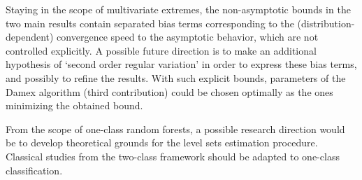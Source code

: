%
Staying in the scope of multivariate extremes, the non-asymptotic bounds in the two main results contain separated bias terms corresponding to the (distribution-dependent) convergence speed to the asymptotic behavior, which are not controlled explicitly.
A possible future direction is to make an additional hypothesis
of  `second order regular variation'  \citep[see \emph{e.g.}][]{deHaan1996}
in order to express these bias terms, and possibly to refine the results.
With such explicit bounds, parameters of the Damex algorithm (third contribution) could be chosen optimally as the ones minimizing the obtained bound.

From the scope of one-class random forests, a possible research direction would be to develop theoretical grounds for the level sets estimation procedure. Classical studies from the two-class framework should be adapted to one-class classification.














